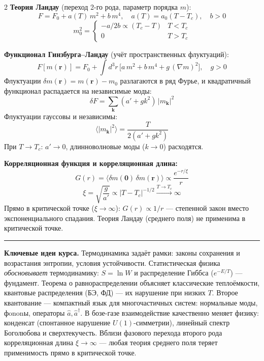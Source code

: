 \documentclass[a4paper,10pt]{article}
\begin{document}
\begin{multicols}{2}
\textbf{Теория Ландау} (переход 2-го рода, параметр порядка $m$):
\begin{equation*}
    F = F_0 + a(T)\,m^2 + b\,m^4, \quad a(T) = a_0(T - T_c),\quad b > 0
\end{equation*}
\begin{equation*}
    m_0^2 = \begin{cases} -a/2b \propto (T_c-T) & T < T_c \\ 0 & T > T_c \end{cases}
\end{equation*}

\textbf{Функционал Гинзбурга--Ландау} (учёт пространственных флуктуаций):
\begin{equation*}
    F[m(\mathbf{r})] = F_0 + \int d^3r\,\bigl[a\,m^2 + b\,m^4 + g\,(\nabla m)^2\bigr], \quad g > 0
\end{equation*}
Флуктуации $\delta m(\mathbf{r}) = m(\mathbf{r}) - m_0$ разлагаются в ряд Фурье, и квадратичный функционал распадается на независимые моды:
\begin{equation*}
    \delta F = \sum_\mathbf{k} (a' + gk^2)\,|m_\mathbf{k}|^2
\end{equation*}
Флуктуации гауссовы и независимы:
\begin{equation*}
    \langle|m_\mathbf{k}|^2\rangle = \frac{T}{2(a' + gk^2)}
\end{equation*}
При $T \to T_c$: $a' \to 0$, длинноволновые моды ($k \to 0$) расходятся.

\textbf{Корреляционная функция и корреляционная длина:}
\begin{equation*}
    G(r) = \langle\delta m(\mathbf{0})\,\delta m(\mathbf{r})\rangle \propto \frac{e^{-r/\xi}}{r}
\end{equation*}
\begin{equation*}
    \boxed{\xi = \sqrt{\frac{g}{a'}} \propto |T - T_c|^{-1/2} \xrightarrow{T \to T_c} \infty}
\end{equation*}
Прямо в критической точке ($\xi \to \infty$): $G(r) \propto 1/r$ --- степенной закон вместо экспоненциального спадания. Теория Ландау (среднего поля) не применима в критической точке.

\end{multicols}

\vspace{0.3em}
\hrule
\vspace{0.4em}

{\small\textbf{Ключевые идеи курса.}
Термодинамика задаёт рамки: законы сохранения и возрастания энтропии, условия устойчивости. Статистическая физика \emph{обосновывает} термодинамику: $S = \ln W$ и распределение Гиббса ($e^{-E/T}$) --- фундамент. Теорема о равнораспределении объясняет классические теплоёмкости, квантовые распределения (БЭ, ФД) --- их нарушение при низких $T$. Второе квантование --- компактный язык для многочастичных систем: нормальные моды, фononы, операторы $\hat{a}, \hat{a}^\dagger$. В бозе-газе взаимодействие качественно меняет физику: конденсат (спонтанное нарушение $U(1)$-симметрии), линейный спектр Боголюбова и сверхтекучесть. Вблизи фазового перехода второго рода корреляционная длина $\xi \to \infty$ --- любая теория среднего поля теряет применимость прямо в критической точке.}
\end{document}
